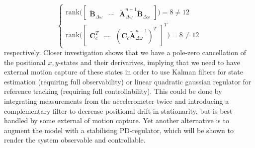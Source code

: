 \documentclass{article}
\begin{document}
\begin{equation}
\begin{cases}
\text{rank}\Big(\begin{bmatrix}  \tilde{\mathbf{B}}_{\Delta\omega}& \cdots &\tilde{\mathbf{A}}_{\Delta\omega}^{n-1}\tilde{\mathbf{B}}_{\Delta\omega}\end{bmatrix}\Big) = 8 \neq 12\\
\text{rank}\Big(\begin{bmatrix} \mathbf{C}_c^T& \cdots &(\mathbf{C}_c\tilde{\mathbf{A}}_{\Delta\omega}^{n-1})^T\end{bmatrix}^T\Big) = 8 \neq 12
\end{cases}
\end{equation}
respectively. Closer investigation shows that we have a pole-zero cancellation of the positional $x,y$-states and their derivarives, implying that we need to have external motion capture of these states in order to use Kalman filters for state estimation (requiring full observability) or linear quadratic gaussian regulator for reference tracking (requiring full controllability). This could be done by integrating measurements from the accelerometer twice and introducing a complementary filter to decrease positional drift in stationarity, but is best handled by some external of motion capture. Yet another alternative is to augment the model with a stabilising PD-regulator, which will be shown to render the system observable and controllable.
\end{document}
